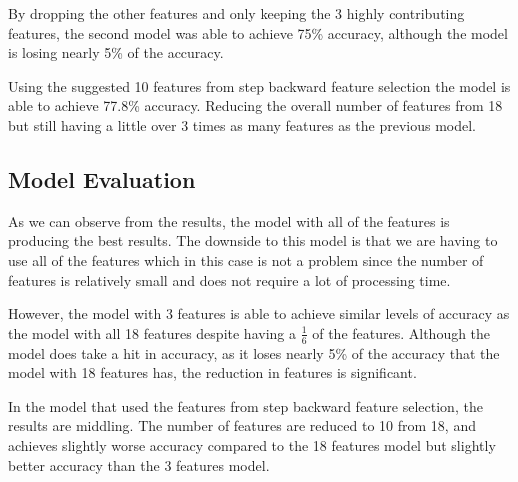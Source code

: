 \documentclass[12pt, a4paper]{article}
\begin{document}
By dropping the other features and only keeping the 3 highly contributing features, the second model was able to achieve 75\% accuracy, although the model is losing nearly 5\% of the accuracy.

Using the suggested 10 features from step backward feature selection the model is able to achieve 77.8\% accuracy. Reducing the overall number of features from 18 but still having a little over 3 times as many features as the previous model.



\subsection{Model Evaluation}
As we can observe from the results, the model with all of the features is producing the best results. The downside to this model is that we are having to use all of the features which in this case is not a problem since the number of features is relatively small and does not require a lot of processing time.

However, the model with 3 features is able to achieve similar levels of accuracy as the model with all 18 features despite having a \( \frac{1}{6} \) of the features. Although the model does take a hit in accuracy, as it loses nearly 5\% of the accuracy that the model with 18 features has, the reduction in features is significant.

In the model that used the features from step backward feature selection, the results are middling. The number of features are reduced to 10 from 18, and achieves slightly worse accuracy compared to the 18 features model but slightly better accuracy than the 3 features model.
\end{document}
